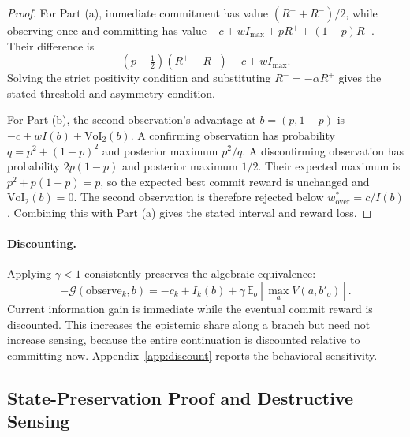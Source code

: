 \documentclass[manuscript, screen, review]{jair}
\begin{document}
\begin{proof}
For Part (a), immediate commitment has value $(R^++R^-)/2$, while observing once and committing has value $-c+wI_{\max}+pR^++(1-p)R^-$. Their difference is
\[
(p-\tfrac12)(R^+-R^-)-c+wI_{\max}.
\]
Solving the strict positivity condition and substituting $R^-=-\alpha R^+$ gives the stated threshold and asymmetry condition.

For Part (b), the second observation's advantage at $b=(p,1-p)$ is $-c+wI(b)+\mathrm{VoI}_2(b)$. A confirming observation has probability $q=p^2+(1-p)^2$ and posterior maximum $p^2/q$. A disconfirming observation has probability $2p(1-p)$ and posterior maximum $1/2$. Their expected maximum is $p^2+p(1-p)=p$, so the expected best commit reward is unchanged and $\mathrm{VoI}_2(b)=0$. The second observation is therefore rejected below $w^*_{\mathrm{over}}=c/I(b)$. Combining this with Part (a) gives the stated interval and reward loss.
\end{proof}

\paragraph{Discounting.} Applying $\gamma<1$ consistently preserves the algebraic equivalence:
\[
-\mathcal G(\mathrm{observe}_k,b)=-c_k+I_k(b)+\gamma\,\mathbb E_o[\max_a V(a,b'_o)].
\]
Current information gain is immediate while the eventual commit reward is discounted. This increases the epistemic share along a branch but need not increase sensing, because the entire continuation is discounted relative to committing now. Appendix~\ref{app:discount} reports the behavioral sensitivity.

\subsection{State-Preservation Proof and Destructive Sensing}
\label{app:theory_factored}
\end{document}
